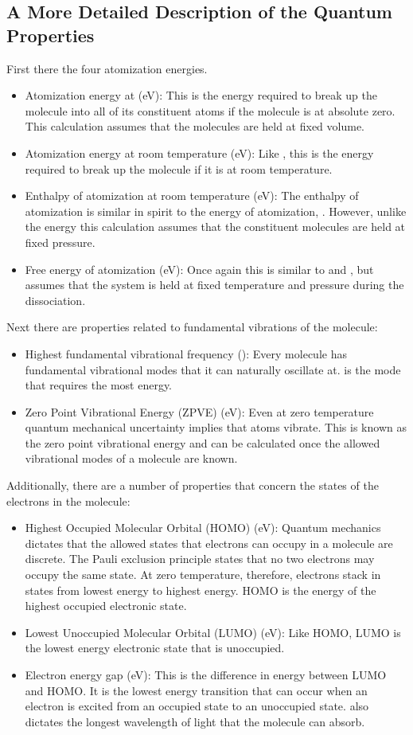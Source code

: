 \documentclass{article}
\begin{document}
\subsection{A More Detailed Description of the Quantum Properties}

First there the four atomization energies. 

\begin{itemize}
    \item Atomization energy at   (eV): This is the energy required to break up the molecule into all of its constituent atoms if the molecule is at absolute zero. This calculation assumes that the molecules are held at fixed volume.
    \item Atomization energy at room temperature  (eV): Like , this is the energy required to break up the molecule if it is at room temperature. \item Enthalpy of atomization at room temperature  (eV): The enthalpy of atomization is similar in spirit to the energy of atomization, . However, unlike the energy this calculation assumes that the constituent molecules are held at fixed pressure.
    \item Free energy of atomization  (eV): Once again this is similar to  and , but assumes that the system is held at fixed temperature and pressure during the dissociation. 
\end{itemize}
Next there are properties related to fundamental vibrations of the molecule:
\begin{itemize}
    \item Highest fundamental vibrational frequency  (): Every molecule has fundamental vibrational modes that it can naturally oscillate at.  is the mode that requires the most energy.
    \item Zero Point Vibrational Energy (ZPVE) (eV): Even at zero temperature quantum mechanical uncertainty implies that atoms vibrate. This is known as the zero point vibrational energy and can be calculated once the allowed vibrational modes of a molecule are known.
\end{itemize}
Additionally, there are a number of properties that concern the states of the electrons in the molecule:
\begin{itemize}
    \item Highest Occupied Molecular Orbital (HOMO)  (eV): Quantum mechanics dictates that the allowed states that electrons can occupy in a molecule are discrete. The Pauli exclusion principle states that no two electrons may occupy the same state. At zero temperature, therefore, electrons stack in states from lowest energy to highest energy. HOMO is the energy of the highest occupied electronic state.
    \item Lowest Unoccupied Molecular Orbital (LUMO)  (eV): Like HOMO, LUMO is the lowest energy electronic state that is unoccupied.
    \item Electron energy gap  (eV): This is the difference in energy between LUMO and HOMO. It is the lowest energy transition that can occur when an electron is excited from an occupied state to an unoccupied state.  also dictates the longest wavelength of light that the molecule can absorb.
\end{itemize}
\end{document}

